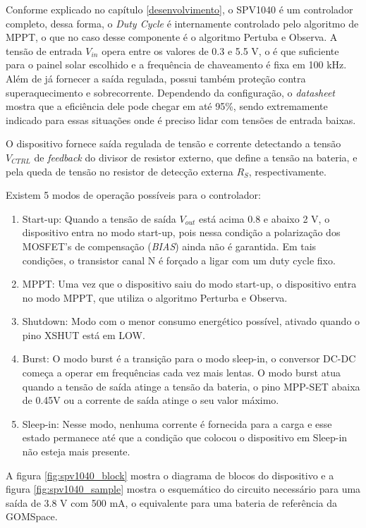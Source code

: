 Conforme explicado no capítulo \ref{desenvolvimento}, o SPV1040 é um controlador completo, dessa forma, o \textit{Duty Cycle} é internamente controlado pelo algoritmo de MPPT, o que no caso desse componente é o algoritmo Pertuba e Observa. A tensão de entrada $V_{in}$ opera entre os valores de 0.3 e 5.5 V, o é que suficiente para o painel solar escolhido e a frequência de chaveamento é fixa em 100 kHz. Além de já fornecer a saída regulada, possui também proteção contra superaquecimento e sobrecorrente. Dependendo da configuração, o \textit{datasheet} mostra que a eficiência dele pode chegar em até 95\%, sendo extremamente indicado para essas situações onde é preciso lidar com tensões de entrada baixas. 

O dispositivo fornece saída regulada de tensão e corrente detectando a tensão $V_{CTRL}$ de \textit{feedback} do divisor de resistor externo, que define a tensão na bateria, e pela queda de tensão no resistor de detecção externa $R_{S}$, respectivamente.

Existem 5 modos de operação possíveis para o controlador:
\begin{enumerate}
    \item Start-up: Quando a tensão de saída $V_{out}$ está acima 0.8 e abaixo 2 V, o dispositivo entra no modo start-up, pois nessa condição a polarização dos MOSFET's de compensação (\textit{BIAS}) ainda não é garantida. Em tais condições, o transistor canal N é forçado a ligar com um duty cycle fixo.
    \item MPPT: Uma vez que o dispositivo saiu do modo start-up, o dispositivo entra no modo MPPT, que utiliza o algoritmo Perturba e Observa.
    \item Shutdown: Modo com o menor consumo energético possível, ativado quando o pino XSHUT está em LOW.
    \item Burst: O modo burst é a transição para o modo sleep-in, o conversor DC-DC começa a operar em frequências cada vez mais lentas. O modo burst atua quando a tensão de saída atinge a tensão da bateria, o pino MPP-SET abaixa de 0.45V ou a corrente de saída atinge o seu valor máximo.
    \item Sleep-in: Nesse modo, nenhuma corrente é fornecida para a carga e esse estado permanece até que a condição que colocou o dispositivo em Sleep-in não esteja mais presente.
\end{enumerate}

A figura \ref{fig:spv1040_block} mostra o diagrama de blocos do dispositivo e a figura \ref{fig:spv1040_sample} mostra o esquemático do circuito necessário para uma saída de 3.8 V com 500 mA, o equivalente para uma bateria de referência da GOMSpace.

